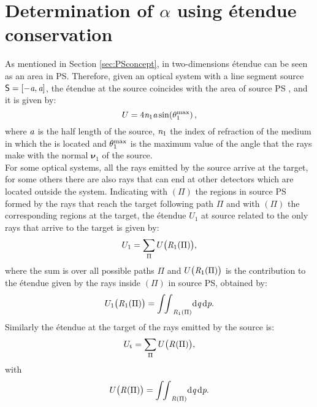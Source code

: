 \section{Determination of $\alpha$ using \'{e}tendue conservation} \label{sec:Tir_alpha}
As mentioned in Section \ref{sec:PSconcept}, in two-dimensions \'{e}tendue can be seen as an area in PS. 
Therefore, given an optical system with a line segment source $\textsf{S} = [-\textit{a}, \textit{a}]$, the \'{e}tendue at the source coincides with the area of source PS , and it is given by:
\begin{equation}\label{eq:etenduesource}
U = 4\textit{n}_1 \textit{a} \sin(\theta_1^{\textrm{max}})\,,
\end{equation}
 where $\textit{a}$ is the half length of the source, $\textit{n}_1$ the index of refraction of the medium in which the  is located and $\theta_1^{\textrm{max}}$ is the maximum value of the angle that the rays make with the normal $\boldsymbol{\nu}_1$ of the source.\\ \indent 
For some optical systems, all the rays emitted by the source arrive at the target, for some others there are also rays that can end at other detectors which are located outside the system. 
Indicating with $(\Pi)$ the regions in source PS formed by the rays that reach the target following path $\Pi$ and with $(\Pi)$ the corresponding regions at the target, the \'{e}tendue $U_1$ at source related to the only rays that arrive to the target is given by:
\begin{equation}\label{eq:etenduesumsource}
U_1 = \sum_\Pi{U\big(\mbox{$\emph{R}_{\textit{$1$}}$}(\Pi)\big)},
\end{equation}
where the sum is over all possible paths $\Pi$ and $U\big(\mbox{$\emph{R}_{\textit{$1$}}$}(\Pi)\big)$ is the contribution to the \'{e}tendue given by the rays inside 
$(\Pi)$ in source PS, obtained by:
\begin{equation}\label{eq:etendueintegralsource}
U_1\big(\mbox{$\emph{R}_{\textit{$1$}}$}(\Pi)\big) = {\int\!\!\int}_{\emph{R}_1(\Pi)} \textrm{d}\textit{q}\,\textrm{d}\textit{p}.
\end{equation}
Similarly the \'{e}tendue at the target of the rays emitted by the source is:
\begin{equation}
U_\textrm{t}= \sum_\Pi{U\big(\mbox{$\emph{R}_{\textit{}}$}(\Pi)\big)},
\end{equation}
with
\begin{equation}\label{eq:etendueintegraltarget}
U\big(\mbox{$\emph{R}_{\textit{}}$}(\Pi)\big) = {\int\!\!\int}_{\emph{R}(\Pi)} \textrm{d}\textit{q}\,\textrm{d}\textit{p}.
\end{equation}
